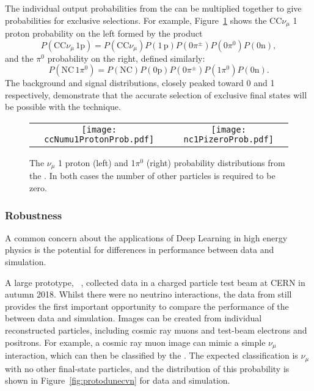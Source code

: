 The individual output probabilities from the  can be multiplied together to give probabilities for exclusive selections. For example, Figure~\ref{fig:exclusive} shows the CC$\nu_\mu$ 1 proton probability on the left formed by the product 
\begin{equation}
P\left(\textrm{CC}\nu_\mu\,1\textrm{p}\right) = P\left(\textrm{CC}\nu_\mu \right) P\left( 1\,\textrm{p} \right) P\left( 0 \pi^\pm \right)P\left( 0 \pi^0 \right) P\left( 0\textrm{n} \right),
\end{equation}
and the $\pi^0$ probability on the right, defined similarly: 
\begin{equation}
P\left(\textrm{NC}\,1\pi^0\right) = P\left(\textrm{NC}\right) P\left(0\textrm{p} \right) P\left(0\pi^\pm \right) P\left(1\pi^0 \right) P\left( 0\textrm{n} \right).
\end{equation}
The background and signal distributions, closely peaked toward 0 and 1 respectively, demonstrate that the accurate selection of exclusive final states will be possible with the   technique. 

\begin{figure}
    \centering
    \begin{tabular}{cc}
		\texttt{[image: ccNumu1ProtonProb.pdf]} &
		\texttt{[image: nc1PizeroProb.pdf]}
	\end{tabular}
	\caption{The $\nu_\mu$ 1 proton (left) and  1$\pi^0$ (right) probability distributions from the . In both cases the number of other particles is required to be zero.}
    \label{fig:exclusive}
\end{figure}

\subsubsection{Robustness}
A common concern about the applications of Deep Learning in high energy physics is the potential for differences in performance between data and simulation. 

A large  prototype, ~\cite{Abi:2017aow}, collected data in a charged particle test beam at CERN in autumn 2018. Whilst there were no neutrino interactions, the data from  still provides the first important opportunity to compare the performance of the  between data and simulation. Images can be created from individual reconstructed particles, including cosmic ray muons and test-beam electrons and positrons. For example, a cosmic ray muon image
can mimic a simple $\nu_\mu$ interaction, which can then be classified by the . The expected classification is $\nu_\mu$ with no other final-state particles, and the distribution of this probability is shown in Figure~\ref{fig:protodunecvn} for data and simulation.


